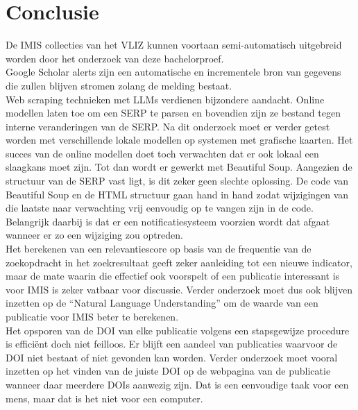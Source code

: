 
\chapter{Conclusie}%
\label{ch:conclusie}

De IMIS collecties van het VLIZ kunnen voortaan semi-automatisch uitgebreid worden door het onderzoek van deze bachelorproef.\\
Google Scholar alerts zijn een automatische en incrementele bron van gegevens die zullen blijven stromen zolang de melding bestaat.\\ 
Web scraping technieken met LLMs verdienen bijzondere aandacht. Online modellen laten toe om een SERP te parsen en bovendien zijn ze bestand tegen interne veranderingen van de SERP. Na dit onderzoek moet er verder getest worden met verschillende lokale modellen op systemen met grafische kaarten. Het succes van de online modellen doet toch verwachten dat er ook lokaal een slaagkans moet zijn. Tot dan wordt er gewerkt met Beautiful Soup. Aangezien de structuur van de SERP vast ligt, is dit zeker geen slechte oplossing. De code van Beautiful Soup en de HTML structuur gaan hand in hand zodat wijzigingen van die laatste naar verwachting vrij eenvoudig op te vangen zijn in de code. Belangrijk daarbij is dat er een notificatiesysteem voorzien wordt dat afgaat wanneer er zo een wijziging zou optreden.\\
Het berekenen van een relevantiescore op basis van de frequentie van de zoekopdracht in het zoekresultaat geeft zeker aanleiding tot een nieuwe indicator, maar de mate waarin die effectief ook voorspelt of een publicatie interessant is voor IMIS is zeker vatbaar voor discussie. Verder onderzoek moet dus ook blijven inzetten op de ``Natural Language Understanding'' om de waarde van een publicatie voor IMIS beter te berekenen.\\
Het opsporen van de DOI van elke publicatie volgens een stapsgewijze procedure is efficiënt doch niet feilloos. Er blijft een aandeel van publicaties waarvoor de DOI niet bestaat of niet gevonden kan worden. Verder onderzoek moet vooral inzetten op het vinden van de juiste DOI op de webpagina van de publicatie wanneer daar meerdere DOIs aanwezig zijn. Dat is een eenvoudige taak voor een mens, maar dat is het niet voor een computer.\\
